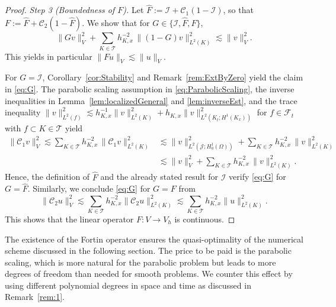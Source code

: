 \documentclass{amsart}
\providecommand{\tria}{\mathcal{T}}
\newcommand{\be}{\begin{equation}}
\newcommand{\ee}{\end{equation}}
\begin{document}
\begin{proof}
\textit{Step 3 (Boundedness of $F$).}
Let $\widehat{F}:= \mathcal{I} + \mathcal{C}_1(1-\mathcal{I})$, so that $F:= \widehat{F} + \mathcal{C}_2(1-\widehat{F})$.
We show that for $G \in \{\mathcal{I}, \widehat{F}, F\}$, 
\be \label{eq:G}
\|G v\|_V^2+ \sum_{K \in \tria} h_{K,x}^{-2}\, \|(1-G)v\|^2_{L^2(K)} \lesssim \|v\|_V^2.
\ee
This yields in particular $\|F u\|_V \lesssim \|u\|_V$.

For $G=\mathcal{I}$, Corollary~\ref{cor:Stability} and Remark~\ref{rem:ExtByZero} yield the claim in \eqref{eq:G}.
%
The parabolic scaling assumption in \eqref{eq:ParabolicScaling}, the inverse inequalities in Lemma~\ref{lem:localizedGeneral} and \ref{lem:inverseEst}, and the trace inequality $\|v\|^2_{L^2(f)} \lesssim h_{K,x}^{-1}\|v\|_{L^2(K)}^2+h_{K,x}\|v\|_{L^2(K_t;H^1(K_x))}^2$ for $f \in \mathcal{F}_t$ with $f \subset K \in \tria$ yield
\begin{equation} \label{eq:temp}
\begin{split}
\|  \mathcal{C}_1 v\|_V^2 \lesssim \sum_{K \in \tria} h_{K,x}^{-2}\, \|\mathcal{C}_1 v\|^2_{L^2(K)} &\lesssim \|v\|^2_{L^2(\mathcal{J};H^1_0(\Omega))}+\sum_{K \in \tria} h_{K,x}^{-2}\, \| v\|^2_{L^2(K)} \\
& \lesssim \|v\|^2_{V}+\sum_{K \in \tria} h_{K,x}^{-2}\, \| v\|^2_{L^2(K)}.
\end{split}
\end{equation}
%
Hence, the definition of $\widehat{F}$ and the already stated result for $\mathcal{I}$ verify \eqref{eq:G} for $G=\widehat{F}$. 
Similarly, we conclude \eqref{eq:G} for $G=F$ from
\begin{equation*}
\|  \mathcal{C}_2 u\|_V^2 \lesssim \sum_{K \in \tria} h_{K,x}^{-2} \|\mathcal{C}_2 u\|^2_{L^2(K)} \lesssim \sum_{K \in \tria} h_{K,x}^{-2} \| u\|^2_{L^2(K)}.
\end{equation*}
%
This shows that the linear operator $F\colon V \to V_h$ is continuous.
\end{proof}
%
The existence of the Fortin operator ensures the quasi-optimality of the numerical scheme discussed in the following section. The price to be paid is the parabolic scaling, which is more natural for the parabolic problem but leads to  more degrees of freedom than needed for smooth problems. We counter this effect by using different polynomial degrees in space and time as discussed in Remark~\ref{rem:1}.
%
%
\end{document}
